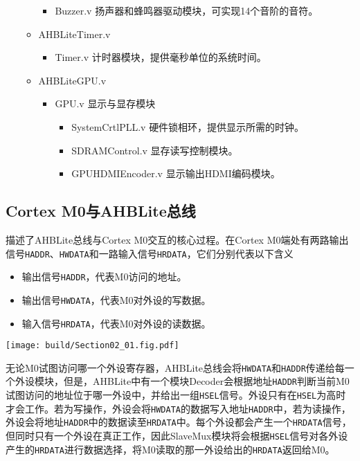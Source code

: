 \begin{itemize}
\begin{itemize}
        \begin{itemize}
            \item Buzzer.v  \textnormal{\small 扬声器和蜂鸣器驱动模块，可实现14个音阶的音符。}
        \end{itemize}
        \item AHBLiteTimer.v 
        \begin{itemize}
            \item Timer.v  \textnormal{\small 计时器模块，提供毫秒单位的系统时间。}
        \end{itemize}
        \item AHBLiteGPU.v
        \begin{itemize}
            \item GPU.v \textnormal{\small 显示与显存模块}
            \begin{itemize}
                \item SystemCrtlPLL.v \textnormal{\small 硬件锁相环，提供显示所需的时钟。}
                \item SDRAMControl.v \textnormal{\small 显存读写控制模块。}
                \item GPUHDMIEncoder.v \textnormal{\small 显示输出HDMI编码模块。}
            \end{itemize}
        \end{itemize}
    \end{itemize}
\end{itemize}


\subsection{Cortex M0与AHBLite总线}
描述了AHBLite总线与Cortex M0交互的核心过程。在Cortex M0端处有两路输出信号\texttt{HADDR}、\texttt{HWDATA}和一路输入信号\texttt{HRDATA}，它们分别代表以下含义
\begin{itemize}
    \item 输出信号\texttt{HADDR}，代表M0访问的地址。
    \item 输出信号\texttt{HWDATA}，代表M0对外设的写数据。
    \item 输入信号\texttt{HRDATA}，代表M0对外设的读数据。
\end{itemize}
\begin{Figure}[硬件架构]
    \texttt{[image: build/Section02\_01.fig.pdf]}
\end{Figure}

无论M0试图访问哪一个外设寄存器，AHBLite总线会将\texttt{HWDATA}和\texttt{HADDR}传递给每一个外设模块，但是，AHBLite中有一个模块Decoder会根据地址\texttt{HADDR}判断当前M0试图访问的地址位于哪一外设中，并给出一组\texttt{HSEL}信号。外设只有在\texttt{HSEL}为高时才会工作。若为写操作，外设会将\texttt{HWDATA}的数据写入地址\texttt{HADDR}中，若为读操作，外设会将地址\texttt{HADDR}中的数据读至\texttt{HRDATA}中。每个外设都会产生一个\texttt{HRDATA}信号，但同时只有一个外设在真正工作，因此SlaveMux模块将会根据\texttt{HSEL}信号对各外设产生的\texttt{HRDATA}进行数据选择，将M0读取的那一外设给出的\texttt{HRDATA}返回给M0。

